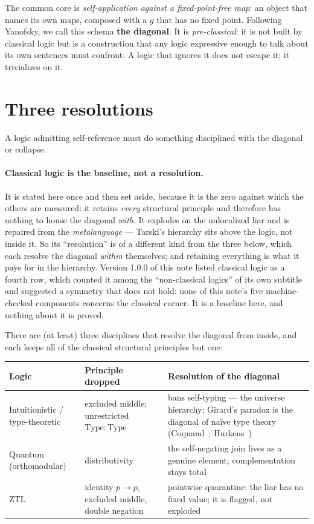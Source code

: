 \documentclass[11pt]{article}
\theoremstyle{remark}
\begin{document}
The common core is \emph{self-application against a fixed-point-free map}: an
object that names its own maps, composed with a $g$ that has no fixed point.
Following Yanofsky, we call this schema \textbf{the diagonal}. It is
\emph{pre-classical}: it is not built by classical logic but is a construction
that any logic expressive enough to talk about its own sentences must
confront. A logic that ignores it does not escape it; it trivializes on it.

\section{Three resolutions}\label{sec:four}

A logic admitting self-reference must do something disciplined with the
diagonal or collapse.

\paragraph{Classical logic is the baseline, not a resolution.} It is stated
here once and then set aside, because it is the zero against which the others
are measured: it retains \emph{every} structural principle and therefore has
nothing to house the diagonal \emph{with}. It explodes on the unlocalized
liar and is repaired from the \emph{metalanguage} --- Tarski's hierarchy
sits above the logic, not inside it. So its ``resolution'' is of a different
kind from the three below, which each resolve the diagonal \emph{within}
themselves; and retaining everything is what it pays for in the hierarchy.
Version 1.0.0 of this note listed classical logic as a fourth row, which
counted it among the ``non-classical logics'' of its own subtitle and
suggested a symmetry that does not hold: none of this note's five
machine-checked components concerns the classical corner. It is a
baseline here, and nothing about it is proved.

There are (at least) three disciplines that resolve the diagonal from
inside, and each keeps all of the classical structural principles but one:

\begin{center}
\renewcommand{\arraystretch}{1.3}
\begin{tabular}{@{}>{\raggedright}p{2.6cm}>{\raggedright}p{3.4cm}p{6.4cm}@{}}
\hline
\textbf{Logic} & \textbf{Principle dropped} & \textbf{Resolution of the diagonal} \\
\hline
Intuitionistic / type-theoretic & excluded middle; unrestricted $\mathrm{Type}:\mathrm{Type}$ & bans self-typing --- the universe hierarchy; Girard's paradox is the diagonal of na\"ive type theory (Coquand~\cite{coquand}; Hurkens~\cite{hurkens}) \\
Quantum (orthomodular) & distributivity & the self-negating join lives as a genuine element; complementation stays total \\
ZTL & identity $p\to p$, excluded middle, double negation & pointwise quarantine: the liar has no fixed value; it is flagged, not exploded~\cite{ztl} \\
\hline
\end{tabular}
\end{center}
\end{document}
